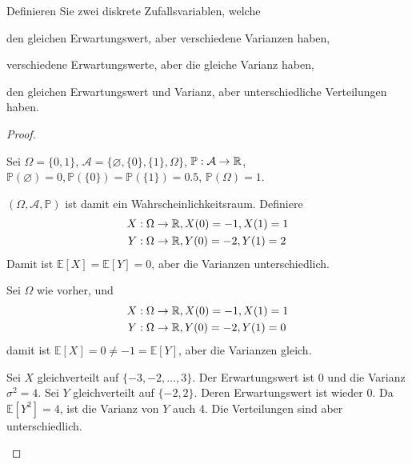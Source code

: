 \begin{Problem}
	Definieren Sie zwei diskrete Zufallsvariablen, welche	
	\begin{parts}
		\item den gleichen Erwartungswert, aber verschiedene Varianzen haben,
		\item verschiedene Erwartungswerte, aber die gleiche Varianz haben,
		\item den gleichen Erwartungswert und Varianz, aber unterschiedliche Verteilungen haben.
	\end{parts}
\end{Problem}

\begin{proof}
	\begin{parts}
		\item Sei $\Omega = \{0,1\}$, $\mathcal{A} = \{\varnothing, \{0\}, \{1\}, \Omega\}$, $\mathbb{P}: \mathcal{A} \to \mathbb{R}$, $\mathbb{P}(\varnothing)=0, \mathbb{P}(\{0\})=\mathbb{P}(\{1\})=0.5$, $\mathbb{P}(\Omega)=1$.
		
		$(\Omega, \mathcal{A}, \mathbb{P})$ ist damit ein Wahrscheinlichkeitsraum. Definiere
		\begin{align*}
			X&:\Omega \to \mathbb{R}, X(0)=-1, X(1) = 1\\
			Y&:\Omega\to \mathbb{R}, Y(0) = -2, Y(1) = 2
		\end{align*}
	Damit ist $\mathbb{E}[X]=\mathbb{E}[Y]=0$, aber die Varianzen unterschiedlich.
	\item Sei $\Omega$ wie vorher, und
			\begin{align*}
		X&:\Omega \to \mathbb{R}, X(0)=-1, X(1) = 1\\
		Y&:\Omega\to \mathbb{R}, Y(0) = -2, Y(1) = 0
	\end{align*}
damit ist $\mathbb{E}[X]=0\neq -1 =\mathbb{E}[Y]$, aber die Varianzen gleich.
\item Sei $X$ gleichverteilt auf $\{-3, -2, \dots, 3\}$. Der Erwartungswert ist 0 und die Varianz $\sigma^2 = 4$. Sei $Y$ gleichverteilt auf $\{-2, 2\}$. Deren Erwartungswert ist wieder 0. Da $\mathbb{E}[Y^2]=4$, ist die Varianz von $Y$ auch 4. Die Verteilungen sind aber unterschiedlich.\qedhere
	\end{parts}
\end{proof}


